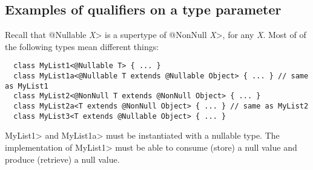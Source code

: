 % 
% 
% 
% 


\subsection{Examples of qualifiers on a type parameter\label{type-parameter-qualifier-examples}}

Recall that \<@Nullable \emph{X}> is a supertype of \<@NonNull \emph{X}>,
for any \emph{X}\@.
Most of of the following types mean different things:

\begin{Verbatim}
  class MyList1<@Nullable T> { ... }
  class MyList1a<@Nullable T extends @Nullable Object> { ... } // same as MyList1
  class MyList2<@NonNull T extends @NonNull Object> { ... }
  class MyList2a<T extends @NonNull Object> { ... } // same as MyList2
  class MyList3<T extends @Nullable Object> { ... }
\end{Verbatim}

\<MyList1> and \<MyList1a> must be instantiated with a nullable type.
The implementation of \<MyList1> must be able to consume (store) a null
value and produce (retrieve) a null value.

